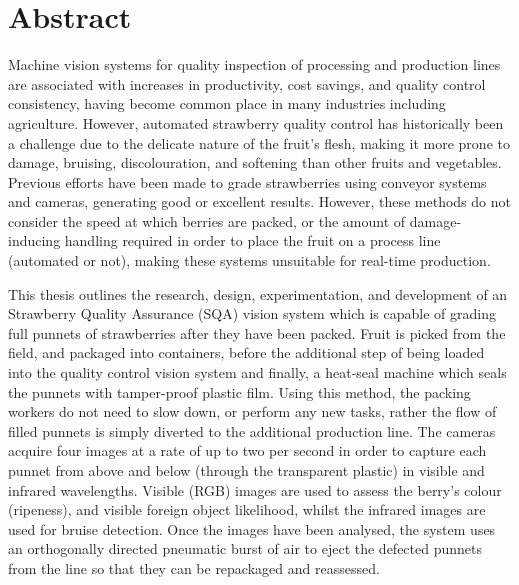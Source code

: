 \documentclass[fleqn,twoside,12pt]{report}
\begin{document}
\restoregeometry









\chapter*{Abstract}



Machine vision systems for quality inspection of processing and production lines are associated with increases in productivity, cost savings, and quality control consistency, having become common place in many industries including agriculture. However, automated strawberry quality control has historically been a challenge due to the delicate nature of the fruit's flesh, making it more prone to damage, bruising, discolouration, and softening than other fruits and vegetables. Previous efforts have been made to grade strawberries using conveyor systems and cameras, generating good or excellent results. However, these methods do not consider the speed at which berries are packed, or the amount of damage-inducing handling required in order to place the fruit on a process line (automated or not), making these systems unsuitable for real-time production. 

This thesis outlines the research, design, experimentation, and development of an Strawberry Quality Assurance (SQA) vision system which is capable of grading full punnets of strawberries after they have been packed. Fruit is picked from the field, and packaged into containers, before the additional step of being loaded into the quality control vision system and finally, a heat-seal machine which seals the punnets with tamper-proof plastic film. Using this method, the packing workers do not need to slow down, or perform any new tasks, rather the flow of filled punnets is simply diverted to the additional production line. The cameras acquire four images at a rate of up to two per second in order to capture each punnet from above and below (through the transparent plastic) in visible and infrared wavelengths. Visible (RGB) images are used to assess the berry's colour (ripeness), and visible foreign object likelihood, whilst the infrared images are used for bruise detection. Once the images have been analysed, the system uses an orthogonally directed pneumatic burst of air to eject the defected punnets from the line so that they can be repackaged and reassessed. 
\end{document}
